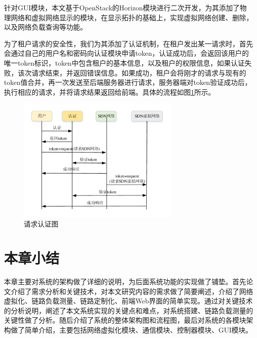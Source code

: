 针对GUI模块，本文基于OpenStack的Horizon模块进行二次开发，为其添加了物理网络和虚拟网络显示的模块，在显示拓扑的基础上，实现虚拟网络创建、删除，以及网络负载查询等功能。

为了租户请求的安全性，我们为其添加了认证机制，在租户发出某一请求时，首先会通过自己的用户名和密码向认证模块申请token，认证成功后，会返回该用户的唯一token标识，token中包含租户的基本信息，以及租户的权限信息，如果认证失败，该次请求结束，并返回错误信息。如果成功，租户会将刚才的请求与现有的token值合并，再一次发送至后端服务器进行请求，服务器端对token验证成功后，执行相应的请求，并将请求结果返回给前端。具体的流程如图\ref{fig:credentials}所示。

\begin{figure}[!htb]
  \centering
  \includegraphics[width=0.7\textwidth]{logo/credentials}
  \caption{请求认证图}
  \label{fig:credentials}
\end{figure}

\section{本章小结}
本章主要对系统的架构做了详细的说明，为后面系统功能的实现做了铺垫。首先论文介绍了需求分析和关键技术，对本文研究内容的需求做了简要阐述，介绍了网络虚拟化、链路负载测量、链路定制化、前端Web界面的简单实现。通过对关键技术的分析说明，阐述了本文系统实现的关键点和难点，对系统搭建、链路负载测量的关键性做了分析。随后介绍了系统的整体架构图和流程图，最后对系统的各模块架构做了简单介绍，主要包括网络虚拟化模块、通信模块、控制器模块、GUI模块。